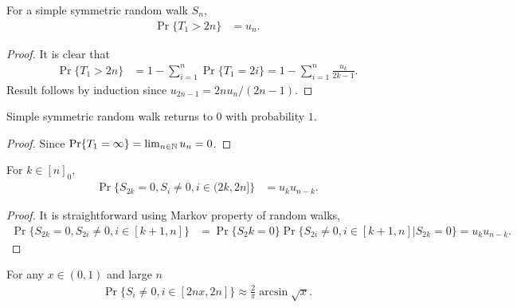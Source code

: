 \documentclass[a4paper,10pt,english]{article}
\begin{document}
\begin{lem} For a simple symmetric random walk $S_n$, 
\begin{align*}
\Pr\{T_1 > 2n\} &= u_n.
\end{align*}
\end{lem}
\begin{proof} It is clear that 
\begin{align*}
\Pr\{T_1 > 2n\} &= 1 - \sum_{i=1}^{n}\Pr\{T_{1} = 2i \} = 1 - \sum_{i=1}^n\frac{u_k}{2k-1}.
\end{align*}
Result follows by induction since $u_{2n-1} = 2n u_n/(2n-1)$.
\end{proof}
\begin{cor} Simple symmetric random walk returns to $0$ with probability $1$.
\end{cor}
\begin{proof} Since $\Pr\{T_1 = \infty\}  = \lim_{n \in \mathbb{N}}u_n = 0$.
\end{proof}
\begin{lem} For $k \in [n]_0$, 
\begin{align*}
\Pr\{S_{2k} = 0, S_i \neq 0, i \in (2k, 2n]\} &= u_ku_{n-k}.
\end{align*}
\end{lem}
\begin{proof} It is straightforward using Markov property of random walks,
\begin{align*}
\Pr\{S_{2k} = 0, S_{2i} \neq 0, i \in [k+1, n]\} &= \Pr\{S_2k = 0\}\Pr\{S_{2i} \neq 0, i \in [k+1, n] | S_{2k} = 0\} = u_ku_{n-k}.
\end{align*}
\end{proof}
\begin{thm} For any $x \in (0,1)$ and large $n$
\begin{align*}
\Pr\{S_i \neq 0, i \in [2nx, 2n]\} \approx \frac{2}{\pi}\arcsin\sqrt{x}.
\end{align*}
\end{thm}
\end{document}
